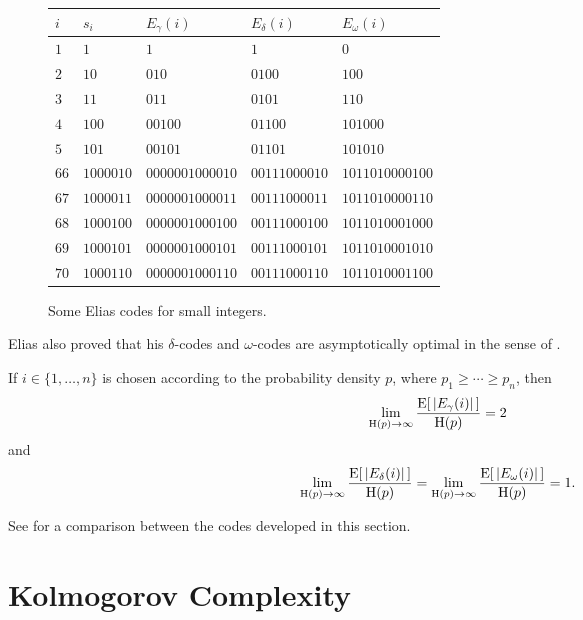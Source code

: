 \begin{figure}
  \centering
  \begin{tabular}{| l | l | l | l | l |}
    \hline
    $i$ & $s_i$ & $E_\gamma(i)$ & $E_\delta(i)$ & $E_\omega(i)$ \\ \hline
    $1$ & $1$ & $1$ & $1$ & $0$ \\ %
    $2$ & $10$ & $010$ & $010 0$ & $100$\\ %
    $3$ & $11$ & $011$ & $010 1$ & $110$\\ %
    $4$ & $100$ & $00100$ & $011 00$ & $101000$ \\ %
    $5$ & $101$ & $00101$ & $011 01$ & $101010$ \\ %
    $66$ & $1000010$ & $0000001000010$ & $00111000010$ & $1011010000100$ \\
    $67$ & $1000011$ & $0000001000011$ & $00111000011$ & $1011010000110$ \\
    $68$ & $1000100$ & $0000001000100$ & $00111000100$ & $1011010001000$ \\ 
    $69$ & $1000101$ & $0000001000101$ & $00111000101$ & $1011010001010$ \\
    $70$ & $1000110$ & $0000001000110$ & $00111000110$ & $1011010001100$ \\ \hline
  \end{tabular}
  \caption{Some Elias codes for small integers.}
\end{figure}

Elias also proved that his $\delta$-codes and $\omega$-codes are
asymptotically optimal in the sense of .
\begin{prop}
  If $i \in \{1, \ldots, n\}$ is chosen according to the probability
  density $p$, where $p_{1} \geq \cdots \geq p_{n}$, then
  \[
  \lim_{\ent(p) \to \infty} \frac{\E\left[\,|E_\gamma(i)|\,\right]}{\ent(p)} = 2
  \]
  and
  \[
  \lim_{\ent(p) \to \infty} \frac{\E\left[\,|E_\delta(i)|\,\right]}{\ent(p)} = \lim_{\ent(p) \to \infty} \frac{\E\left[\,|E_\omega(i)|\,\right]}{\ent(p)} = 1 .
  \]
\end{prop}

See  for a comparison between the codes developed
in this section.

\section{Kolmogorov Complexity}

